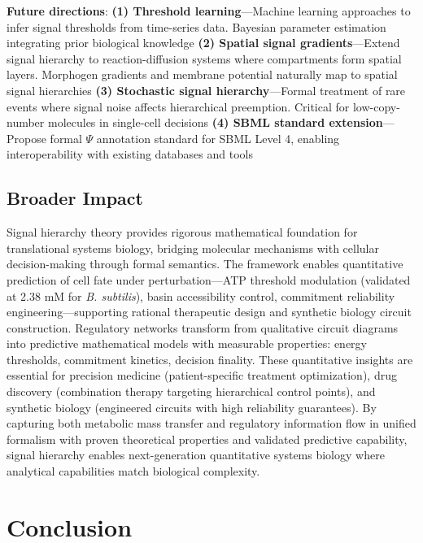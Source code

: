 \documentclass[twocolumn,11pt]{article}
\begin{document}
\vspace{3pt}
\noindent\textbf{Future directions}: \textbf{(1) Threshold learning}---Machine learning approaches to infer signal thresholds from time-series data. Bayesian parameter estimation integrating prior biological knowledge \textbf{(2) Spatial signal gradients}---Extend signal hierarchy to reaction-diffusion systems where compartments form spatial layers. Morphogen gradients and membrane potential naturally map to spatial signal hierarchies \textbf{(3) Stochastic signal hierarchy}---Formal treatment of rare events where signal noise affects hierarchical preemption. Critical for low-copy-number molecules in single-cell decisions \textbf{(4) SBML standard extension}---Propose formal $\Psi$ annotation standard for SBML Level 4, enabling interoperability with existing databases and tools

\subsection{Broader Impact}

\vspace{3pt}
\noindent Signal hierarchy theory provides rigorous mathematical foundation for translational systems biology, bridging molecular mechanisms with cellular decision-making through formal semantics. The framework enables quantitative prediction of cell fate under perturbation---ATP threshold modulation (validated at 2.38 mM for \textit{B. subtilis}), basin accessibility control, commitment reliability engineering---supporting rational therapeutic design and synthetic biology circuit construction. Regulatory networks transform from qualitative circuit diagrams into predictive mathematical models with measurable properties: energy thresholds, commitment kinetics, decision finality. These quantitative insights are essential for precision medicine (patient-specific treatment optimization), drug discovery (combination therapy targeting hierarchical control points), and synthetic biology (engineered circuits with high reliability guarantees). By capturing both metabolic mass transfer and regulatory information flow in unified formalism with proven theoretical properties and validated predictive capability, signal hierarchy enables next-generation quantitative systems biology where analytical capabilities match biological complexity.

\section{Conclusion}
\end{document}
